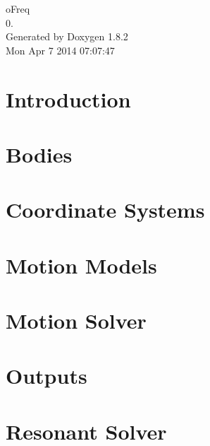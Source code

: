 \documentclass{book}
\begin{document}
\hypersetup{pageanchor=false,citecolor=blue}
\begin{titlepage}
\vspace*{7cm}
\begin{center}
{\Large o\-Freq \\[1ex]\large 0. }\\
\vspace*{1cm}
{\large Generated by Doxygen 1.8.2}\\
\vspace*{0.5cm}
{\small Mon Apr 7 2014 07:07:47}\\
\end{center}
\end{titlepage}
\clearemptydoublepage
{}
\tableofcontents
\clearemptydoublepage
{}
\hypersetup{pageanchor=true,citecolor=blue}
\chapter{Introduction}
\label{index}\hypertarget{index}{}
\chapter{Bodies}
\label{bodies}
\hypertarget{bodies}{}

\chapter{Coordinate Systems}
\label{coordinate_systems}
\hypertarget{coordinate_systems}{}

\chapter{Motion Models}
\label{motion_models}
\hypertarget{motion_models}{}

\chapter{Motion Solver}
\label{motion_solver}
\hypertarget{motion_solver}{}

\chapter{Outputs}
\label{outputs}
\hypertarget{outputs}{}

\chapter{Resonant Solver}
\label{resonant_solver}
\hypertarget{resonant_solver}{}

\end{document}
